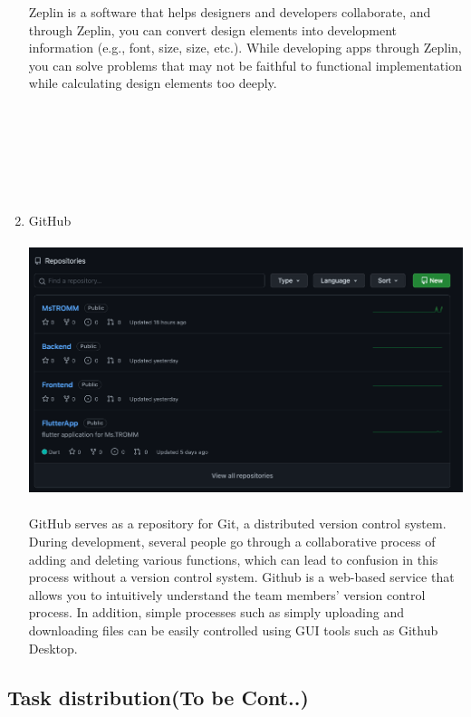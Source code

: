 \documentclass[conference]{IEEEtran}
\begin{document}
\begin{enumerate}
    Zeplin is a software that helps designers and developers collaborate, and through Zeplin, you can convert design elements into development information (e.g., font, size, size, etc.). While developing apps through Zeplin, you can solve problems that may not be faithful to functional implementation while calculating design elements too deeply. \\ \\ \\ \\ \\ \\ \\
    \item GitHub\\\\
    \includegraphics[]{Gtib.png}
 \\ \\ GitHub serves as a repository for Git, a distributed version control system. During development, several people go through a collaborative process of adding and deleting various functions, which can lead to confusion in this process without a version control system. Github is a web-based service that allows you to intuitively understand the team members' version control process. In addition, simple processes such as simply uploading and downloading files can be easily controlled using GUI tools such as Github Desktop. \\
\end{enumerate}{}

\subsection{Task distribution(To be Cont..)\\}
\end{document}
